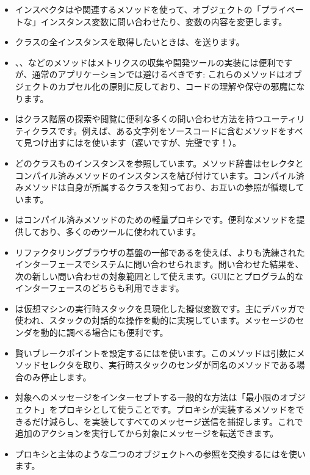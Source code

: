 \documentclass[a4paper,10pt,twoside]{book}
\begin{document}
\begin{itemize}
\item インスペクタはや関連するメソッドを使って、オブジェクトの「プライベートな」インスタンス変数に問い合わせたり、変数の内容を変更します。
\item クラスの全インスタンスを取得したいときは、を送ります。
\item {}、、などのメソッドはメトリクスの収集や開発ツールの実装には便利ですが、通常のアプリケーションでは避けるべきです: これらのメソッドはオブジェクトのカプセル化の原則に反しており、コードの理解や保守の邪魔になります。
\item {}はクラス階層の探索や閲覧に便利な多くの問い合わせ方法を持つユーティリティクラスです。例えば、ある文字列をソースコードに含むメソッドをすべて見つけ出すにはを使います（遅いですが、完璧です！）。
\item どのクラスものインスタンスを参照しています。メソッド辞書はセレクタとコンパイル済みメソッドのインスタンスを結び付けています。コンパイル済みメソッドは自身が所属するクラスを知っており、お互いの参照が循環しています。
\item {}はコンパイル済みメソッドのための軽量プロキシです。便利なメソッドを提供しており、多くの\st のツールに使われています。
\item リファクタリングブラウザの基盤の一部であるを使えば、よりも洗練されたインターフェースでシステムに問い合わせられます。問い合わせた結果を、次の新しい問い合わせの対象範囲として使えます。GUIにとプログラム的なインターフェースのどちらも利用できます。
\item {}は仮想マシンの実行時スタックを具現化した擬似変数です。主にデバッガで使われ、スタックの対話的な操作を動的に実現しています。メッセージのセンダを動的に調べる場合にも便利です。
\item 賢いブレークポイントを設定するにはを使います。このメソッドは引数にメソッドセレクタを取り、実行時スタックのセンダが同名のメソッドである場合のみ停止します。
\item 対象へのメッセージをインターセプトする一般的な方法は「最小限のオブジェクト」をプロキシとして使うことです。プロキシが実装するメソッドをできるだけ減らし、を実装してすべてのメッセージ送信を捕捉します。これで追加のアクションを実行してから対象にメッセージを転送できます。
\item プロキシと主体のような二つのオブジェクトへの参照を交換するにはを使います。

\end{itemize}
\end{document}
